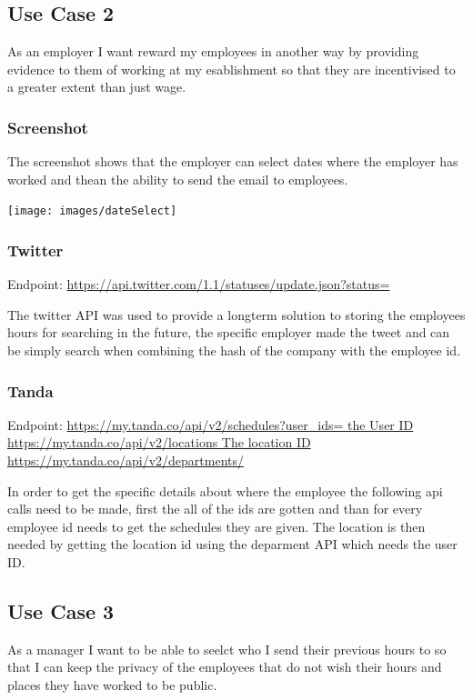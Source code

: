 \documentclass[12pt]{article}
\begin{document}
\subsection{Use Case 2}
As an employer I want reward my employees in another way by providing evidence to them of working at my esablishment so
that they are incentivised to a greater extent than just wage.



\subsubsection{Screenshot}
The screenshot shows that the employer can select dates where the employer has worked and thean the ability to send the email to employees.

\texttt{[image: images/dateSelect]}\\[.1cm]

\subsubsection{Twitter}
Endpoint: \url{https://api.twitter.com/1.1/statuses/update.json?status=}

The twitter API was used to provide a longterm solution to storing the employees hours for searching in the future,
the specific employer made the tweet and can be simply search when combining the hash of the company with the employee id.


\subsubsection{Tanda}
Endpoint: \url{https://my.tanda.co/api/v2/schedules?user_ids= the User ID}
\url{https://my.tanda.co/api/v2/locations The location ID}
\url{https://my.tanda.co/api/v2/departments/}

In order to get the specific details about where the employee the following api calls need to be made, first the all of the
ids are gotten and than for every employee id needs to get the schedules they are given. The location is then needed by getting the location id using the deparment API which needs the user ID.

\subsection{Use Case 3}

As a manager I want to be able to seelct who I send their previous hours to so that I can keep the privacy of the
employees that do not wish their hours and places they have worked to be public.
\end{document}
